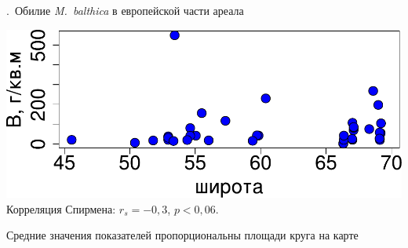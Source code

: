 \documentclass[aspectratio=169, xcolor=table]{beamer}
\begin{document}
\begin{frame}{\insertpagenumber.\ Обилие {\it M.~balthica} в европейской части ареала}
\begin{minipage}[t]{.49\linewidth}
\begin{center}
			\includegraphics[width=.9\textwidth]{lat_vs_Bmean_big1.pdf}\\
{\scriptsize Корреляция Спирмена: $r_{s} = -0,3$, $p < 0,06$.}
		\end{center}
	\end{minipage}

{\tiny Средние значения показателей пропорциональны площади круга на карте}
\end{frame}



\end{document}

